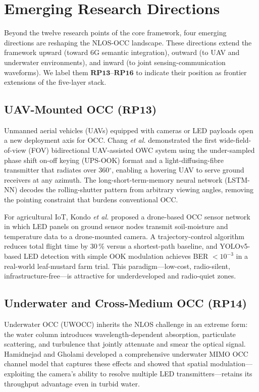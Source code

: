 \documentclass[10pt,a4paper]{article}
\newcommand{\rp}[1]{\textbf{RP#1}}
\begin{document}
\section{Emerging Research Directions}
\label{sec:emerging}

Beyond the twelve research points of the core framework, four emerging
directions are reshaping the NLOS-OCC landscape. These directions extend
the framework upward (toward 6G semantic integration), outward (to UAV
and underwater environments), and inward (to joint sensing-communication
waveforms). We label them $\rp{13}$--$\rp{16}$ to indicate their
position as frontier extensions of the five-layer stack.

\subsection{UAV-Mounted OCC ($\rp{13}$)}
\label{sec:rp13}

Unmanned aerial vehicles (UAVs) equipped with cameras or LED payloads
open a new deployment axis for OCC. Chang \emph{et al.}
\cite{chang2026uavocc} demonstrated the first wide-field-of-view (FOV)
bidirectional UAV-assisted OWC system using the under-sampled phase
shift on-off keying (UPS-OOK) format and a light-diffusing-fibre
transmitter that radiates over 360$^\circ$, enabling a hovering UAV to
serve ground receivers at any azimuth. The long-short-term-memory neural
network (LSTM-NN) decodes the rolling-shutter pattern from arbitrary
viewing angles, removing the pointing constraint that burdens
conventional OCC.

For agricultural IoT, Kondo \emph{et al.} \cite{kondo2024farmocc}
proposed a drone-based OCC sensor network in which LED panels on ground
sensor nodes transmit soil-moisture and temperature data to a
drone-mounted camera. A trajectory-control algorithm reduces total
flight time by 30\,\% versus a shortest-path baseline, and YOLOv5-based
LED detection with simple OOK modulation achieves BER $<10^{-3}$ in a
real-world leaf-mustard farm trial. This paradigm---low-cost,
radio-silent, infrastructure-free---is attractive for underdeveloped and
radio-quiet zones.

\subsection{Underwater and Cross-Medium OCC ($\rp{14}$)}
\label{sec:rp14}

Underwater OCC (UWOCC) inherits the NLOS challenge in an extreme form:
the water column introduces wavelength-dependent absorption, particulate
scattering, and turbulence that jointly attenuate and smear the optical
signal. Hamidnejad and Gholami \cite{hamidnejad2023uwmimoocc} developed
a comprehensive underwater MIMO OCC channel model that captures these
effects and showed that spatial modulation---exploiting the camera's
ability to resolve multiple LED transmitters---retains its throughput
advantage even in turbid water.
\end{document}
